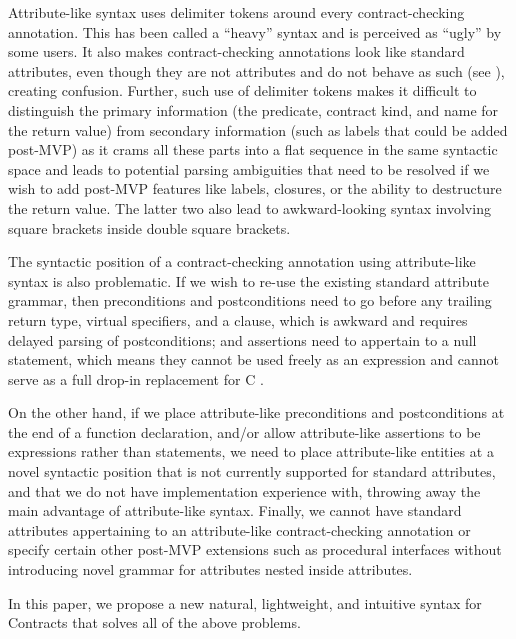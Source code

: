 Attribute-like syntax uses \tcode{[[ ... ]]} delimiter tokens around every contract-checking annotation. This has been called a ``heavy'' syntax and is  perceived as ``ugly'' by some users. It also makes contract-checking annotations look like standard attributes, even though they are not attributes and do not behave as such (see \cite{P2487R1}), creating confusion. Further, such use of delimiter tokens makes it difficult to distinguish the primary information (the predicate, contract kind, and name for the return value) from secondary information (such as labels that could be added post-MVP) as it crams all these parts into a flat sequence in the same syntactic space and leads to potential parsing ambiguities that need to be resolved if we wish to add post-MVP features like labels, closures, or the ability to destructure the return value. The latter two also lead to awkward-looking syntax involving square brackets inside double square brackets.

The syntactic position of a contract-checking annotation using attribute-like syntax is also problematic. If we wish to re-use the existing standard attribute grammar, then preconditions and postconditions need to go before any trailing return type, virtual specifiers, and a  clause, which is awkward and requires delayed parsing of postconditions; and assertions need to appertain to a null statement, which means they cannot be used freely as an expression and cannot serve as a full drop-in replacement for C .

On the other hand, if we place attribute-like preconditions and postconditions at the end of a function declaration, and/or allow attribute-like assertions to be expressions rather than statements, we need to place attribute-like entities at a novel syntactic position that is not currently supported for standard attributes, and that we do not have implementation experience with, throwing away the main advantage of attribute-like syntax. Finally, we cannot have standard attributes appertaining to an attribute-like contract-checking annotation or specify certain other post-MVP extensions such as procedural interfaces without introducing novel grammar for attributes nested inside attributes.

In this paper, we propose a new natural, lightweight, and intuitive syntax for Contracts that solves all of the above problems.
 

